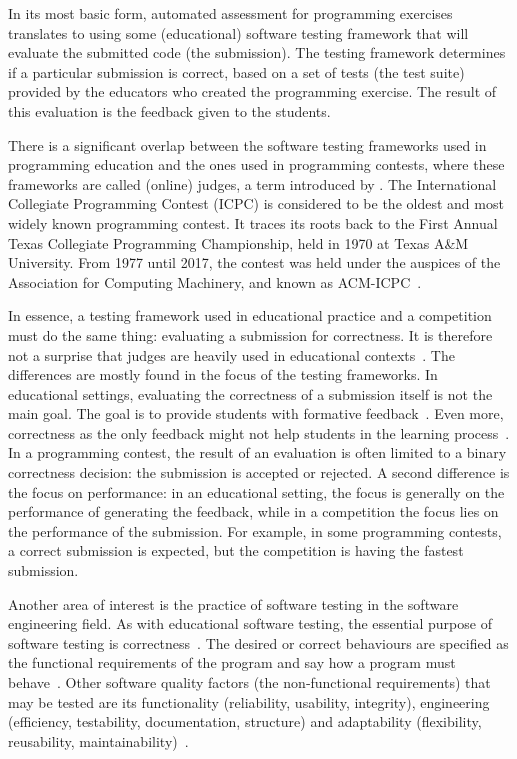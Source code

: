 \documentclass[../main]{subfiles}
\begin{document}
In its most basic form, automated assessment for programming exercises translates to using some (educational) software testing framework that will evaluate the submitted code (the submission).
The testing framework determines if a particular submission is correct, based on a set of tests (the test suite) provided by the educators who created the programming exercise.
The result of this evaluation is the feedback given to the students.

There is a significant overlap between the software testing frameworks used in programming education and the ones used in programming contests, where these frameworks are called (online) judges, a term introduced by \textcite{kurniaOnlineJudge2001}.
The International Collegiate Programming Contest (ICPC) is considered to be the oldest and most widely known programming contest.
It traces its roots back to the First Annual Texas Collegiate Programming Championship, held in 1970 at Texas A\&M University.
From 1977 until 2017, the contest was held under the auspices of the Association for Computing Machinery, and known as ACM-ICPC~\autocite{ICPCFactSheet2023}.

In essence, a testing framework used in educational practice and a competition must do the same thing: evaluating a submission for correctness.
It is therefore not a surprise that judges are heavily used in educational contexts~\autocite{wasikSurveyOnlineJudge2018,zinovievaUseOnlineCoding2021,liuWhoJudgesJudge2023}.
The differences are mostly found in the focus of the testing frameworks.
In educational settings, evaluating the correctness of a submission itself is not the main goal.
The goal is to provide students with formative feedback~\autocite{caizaProgrammingAssignmentsAutomatic2013}.
Even more, correctness as the only feedback might not help students in the learning process~\autocite{haoUnderstandingEffectiveDesign2021}.
In a programming contest, the result of an evaluation is often limited to a binary correctness decision: the submission is accepted or rejected.
A second difference is the focus on performance: in an educational setting, the focus is generally on the performance of generating the feedback, while in a competition the focus lies on the performance of the submission.
For example, in some programming contests, a correct submission is expected, but the competition is having the fastest submission.

Another area of interest is the practice of software testing in the software engineering field.
As with educational software testing, the essential purpose of software testing is correctness~\autocite{panSoftwareTesting1999}.
The desired or correct behaviours are specified as the functional requirements of the program and say how a program must behave~\autocite{bassSoftwareArchitecturePractice2021}.
Other software quality factors (the non‐functional requirements) that may be tested are its functionality (reliability, usability, integrity), engineering (efficiency, testability, documentation, structure) and adaptability (flexibility, reusability, maintainability)~\autocite{hetzelCompleteGuideSoftware1988}.
\end{document}
